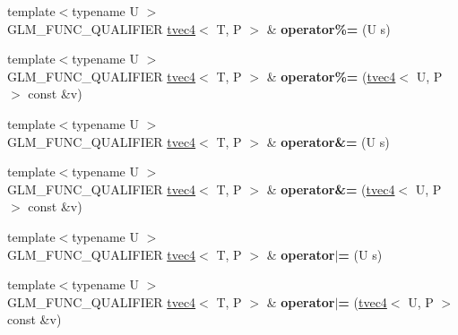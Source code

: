 \begin{DoxyCompactItemize}
\item 
{\footnotesize template$<$typename U $>$ }\\G\+L\+M\+\_\+\+F\+U\+N\+C\+\_\+\+Q\+U\+A\+L\+I\+F\+I\+ER \hyperlink{structglm_1_1detail_1_1tvec4}{tvec4}$<$ T, P $>$ \& {\bfseries operator\%=} (U s)\hypertarget{structglm_1_1detail_1_1tvec4_a39fbc616d6315dd06d87f6d9545a2a6c}{}\label{structglm_1_1detail_1_1tvec4_a39fbc616d6315dd06d87f6d9545a2a6c}

\item 
{\footnotesize template$<$typename U $>$ }\\G\+L\+M\+\_\+\+F\+U\+N\+C\+\_\+\+Q\+U\+A\+L\+I\+F\+I\+ER \hyperlink{structglm_1_1detail_1_1tvec4}{tvec4}$<$ T, P $>$ \& {\bfseries operator\%=} (\hyperlink{structglm_1_1detail_1_1tvec4}{tvec4}$<$ U, P $>$ const \&v)\hypertarget{structglm_1_1detail_1_1tvec4_a2168cec5b85e1dbdd947436d987ecbeb}{}\label{structglm_1_1detail_1_1tvec4_a2168cec5b85e1dbdd947436d987ecbeb}

\item 
{\footnotesize template$<$typename U $>$ }\\G\+L\+M\+\_\+\+F\+U\+N\+C\+\_\+\+Q\+U\+A\+L\+I\+F\+I\+ER \hyperlink{structglm_1_1detail_1_1tvec4}{tvec4}$<$ T, P $>$ \& {\bfseries operator\&=} (U s)\hypertarget{structglm_1_1detail_1_1tvec4_aade398fa99de720151babd3fccce5500}{}\label{structglm_1_1detail_1_1tvec4_aade398fa99de720151babd3fccce5500}

\item 
{\footnotesize template$<$typename U $>$ }\\G\+L\+M\+\_\+\+F\+U\+N\+C\+\_\+\+Q\+U\+A\+L\+I\+F\+I\+ER \hyperlink{structglm_1_1detail_1_1tvec4}{tvec4}$<$ T, P $>$ \& {\bfseries operator\&=} (\hyperlink{structglm_1_1detail_1_1tvec4}{tvec4}$<$ U, P $>$ const \&v)\hypertarget{structglm_1_1detail_1_1tvec4_a8a3a49f8c26ce9f3f8330703018a57ce}{}\label{structglm_1_1detail_1_1tvec4_a8a3a49f8c26ce9f3f8330703018a57ce}

\item 
{\footnotesize template$<$typename U $>$ }\\G\+L\+M\+\_\+\+F\+U\+N\+C\+\_\+\+Q\+U\+A\+L\+I\+F\+I\+ER \hyperlink{structglm_1_1detail_1_1tvec4}{tvec4}$<$ T, P $>$ \& {\bfseries operator$\vert$=} (U s)\hypertarget{structglm_1_1detail_1_1tvec4_a0a81f104c676c2317375b44b39f335bc}{}\label{structglm_1_1detail_1_1tvec4_a0a81f104c676c2317375b44b39f335bc}

\item 
{\footnotesize template$<$typename U $>$ }\\G\+L\+M\+\_\+\+F\+U\+N\+C\+\_\+\+Q\+U\+A\+L\+I\+F\+I\+ER \hyperlink{structglm_1_1detail_1_1tvec4}{tvec4}$<$ T, P $>$ \& {\bfseries operator$\vert$=} (\hyperlink{structglm_1_1detail_1_1tvec4}{tvec4}$<$ U, P $>$ const \&v)\hypertarget{structglm_1_1detail_1_1tvec4_a73389ea20bb805a54b9699bca730f142}{}\label{structglm_1_1detail_1_1tvec4_a73389ea20bb805a54b9699bca730f142}


\end{DoxyCompactItemize}
